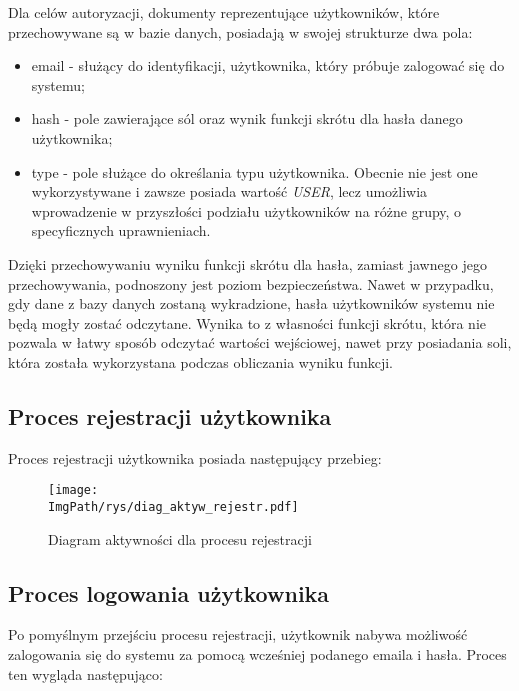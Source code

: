 \documentclass[a4paper,12pt,twoside,openany]{report}
\newcommand{\ImgPath}{.}
\begin{document}
Dla celów autoryzacji, dokumenty reprezentujące użytkowników, które przechowywane są w bazie danych, posiadają w swojej strukturze dwa pola:
\begin{itemize}
	\item email - służący do identyfikacji, użytkownika, który próbuje zalogować się do systemu;
	
	\item hash - pole zawierające sól oraz wynik funkcji skrótu dla hasła danego użytkownika;
	
	\item type - pole służące do określania typu użytkownika. Obecnie nie jest one wykorzystywane i zawsze posiada wartość \textit{USER}, lecz umożliwia wprowadzenie w przyszłości podziału użytkowników na różne grupy, o specyficznych uprawnieniach.
	
\end{itemize}
Dzięki przechowywaniu wyniku funkcji skrótu dla hasła, zamiast jawnego jego przechowywania, podnoszony jest poziom bezpieczeństwa. Nawet w przypadku, gdy dane z bazy danych zostaną wykradzione, hasła użytkowników systemu nie będą mogły zostać odczytane. Wynika to z własności funkcji skrótu, która nie pozwala w łatwy sposób odczytać wartości wejściowej, nawet przy posiadania soli, która została wykorzystana podczas obliczania wyniku funkcji.


\subsection{Proces rejestracji użytkownika}

Proces rejestracji użytkownika posiada następujący przebieg:
 \begin{figure}[!htbp]
	\begin{center}
		\centering
		\texttt{[image: \\ImgPath/rys/diag\_aktyw\_rejestr.pdf]}
	\end{center}
	\caption{Diagram aktywności dla procesu rejestracji}
	\label{diagramAktywnosciRejstracja}
\end{figure}
\newpage

\subsection{Proces logowania użytkownika}
Po pomyślnym przejściu procesu rejestracji, użytkownik nabywa możliwość zalogowania się do systemu za pomocą wcześniej podanego emaila i hasła. Proces ten wygląda następująco:
\end{document}
